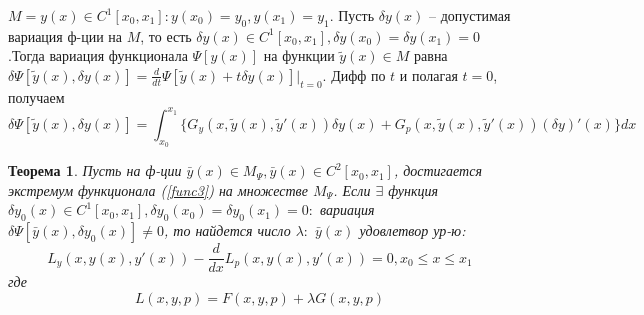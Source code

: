 \documentclass{article}
\newtheorem{theorem}{Теорема}[]
\begin{document}
$M = {y(x) \in C^1[x_0, x_1] : y(x_0) = y_0, y(x_1) = y_1}$.
Пусть $\delta y(x)$ – допустимая вариация ф-ции на $M$, то есть $\delta y(x) \in C^1[x_0, x_1], \delta y(x_0) = \delta y(x_1) = 0$.Тогда вариация функционала $\Psi [y(x)]$ на функции $\widetilde y(x)\in M$ равна $\delta \Psi[\widetilde y(x), \delta y(x)]=\frac{d}{dt}\Psi[\widetilde y(x) + t\delta y(x)]\Big|_{t=0}$. Дифф по $t$ и полагая $t = 0$, получаем 
$$\delta\Psi[\widetilde y(x), \delta y(x)]= \int_{x_0}^{x_1}\Big\{G_y(x, \widetilde y(x), \widetilde y'(x))\delta y(x) + G_p(x, \widetilde y(x), \widetilde y'(x))(\delta y)'(x) \Big\}dx$$
\begin{theorem}
    Пусть на ф-ции $\bar y(x) \in M_\Psi, \bar y(x) \in C^2[x_0, x_1]$,
    достигается экстремум функционала (\ref{func3}) на множестве $M_\Psi$. Если
    $\exists$ функция $\delta y_0(x) \in C^1[x_0, x_1], \delta y_0(x_0) = \delta y_0(x_1) = 0:$ вариация $\delta\Psi[\bar y(x), \delta y_0(x)] \neq 0$, то найдется число $\lambda:$ $\bar y(x)$ удовлетвор ур-ю:
    \begin{equation}
        L_y(x, y(x), y'(x))-\frac{d}{dx}L_p(x, y(x), y'(x))=0, x_0 \leq x \leq x_1
        \label{kak_ze_i_zaebalsya}
    \end{equation}
    где 
    \begin{equation}
        L(x, y, p) = F(x, y, p) + \lambda G(x, y, p)
        \label{wtf}
    \end{equation}

\end{theorem}
\end{document}
